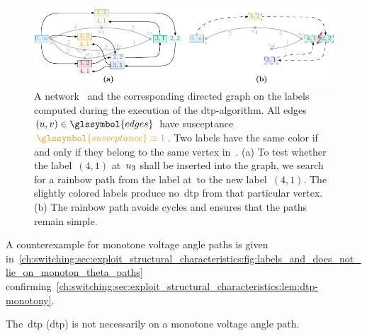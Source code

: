 % 
\begin{figure}[tb!]
    \centering
    \includegraphics{switchplacement/figures/dtp_labels_to_colored_dag.pdf}
    \caption[The directed label graph after an {\gls{dtp}}-algorithm
    execution.]{%
    A network~ and the corresponding directed graph on
    the labels computed during the execution of the {\gls{dtp}}-algorithm.
    All edges~$(\vertexa,\vertexb)\in\glssymbol{edges}$ have
    susceptance~$\textcolor{SUSCEPTANCE}{\glssymbol{susceptance}\equiv 1}$.
    Two labels have the same color if and only if they belong to the same
    vertex in~. (a) To test whether the label~$(4,1)$
    at~$u_3$ shall be inserted into the graph, we search for a
    rainbow path from the label at~\source to the new label~$(4,1)$. The
    slightly colored labels produce no~\gls{dtp} from that particular
    vertex. (b) The rainbow path avoids cycles and ensures that the paths
    remain simple. 
    }%
    \label{ch:switching:sec:exploit_structural_characteristics:fig:dtp_labels_to_colored_dag}
\end{figure}
% 
A counterexample for monotone voltage angle paths is given in~\cref{ch:switching:sec:exploit_structural_characteristics:fig:labels_and_does_not_lie_on_monoton_theta_paths} 
confirming~\cref{ch:switching:sec:exploit_structural_characteristics:lem:dtp-monotony}.
%
\begin{lemma}
    The~\acrlong{dtp} (\gls{dtp}) is not necessarily on a monotone voltage
    angle path.
    \label{ch:switching:sec:exploit_structural_characteristics:lem:dtp-monotony}
\end{lemma}  
% 
